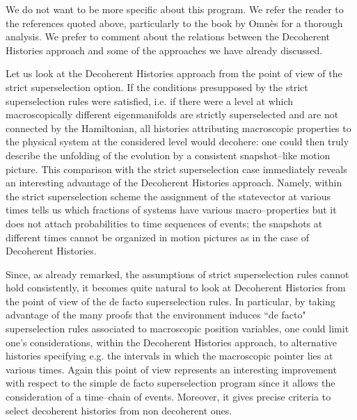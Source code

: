 \documentclass[10pt,a4paper]{article}
\begin{document}
We do not want to be more specific about this program. We refer
the reader to the references quoted above, particularly to the
book \cite{omn2} by Omn\`es for a thorough analysis. We prefer to
comment about the relations between the Decoherent Histories
approach and some of the approaches we have already discussed.

Let us look at the Decoherent Histories approach from the point of
view of the strict superselection  option. If the conditions
presupposed by the strict superselection rules were satisfied,
i.e. if there were a level at which macroscopically different
eigenmanifolds are strictly superselected and are not connected by
the Hamiltonian, all histories attributing macroscopic properties
to the physical system at the considered level would decohere: one
could then truly describe the unfolding of the evolution by a
consistent snapshot--like motion picture. This comparison with the
strict superselection case immediately reveals an interesting
advantage of the Decoherent Histories approach. Namely, within the
strict superselection scheme the assignment of the statevector at
various times tells us which fractions of systems have various
macro--properties but it does not attach probabilities to time
sequences of events; the snapshots at different times cannot be
organized in motion pictures as in the case of Decoherent
Histories.

Since, as already remarked, the assumptions of strict
superselection rules cannot hold consistently, it becomes quite
natural to look at Decoherent Histories from the point of view of
the de facto superselection rules. In particular, by taking
advantage of the many proofs that the environment induces ``de
facto" superselection rules associated to macroscopic position
variables, one could limit one's considerations, within the
Decoherent Histories approach, to alternative histories specifying
e.g. the intervals in which the macroscopic pointer lies at
various times. Again this point of view represents an interesting
improvement with respect to the simple de facto superselection
program since it allows the consideration of a time--chain of
events. Moreover, it gives precise criteria to select decoherent
histories from non decoherent ones.
\end{document}
